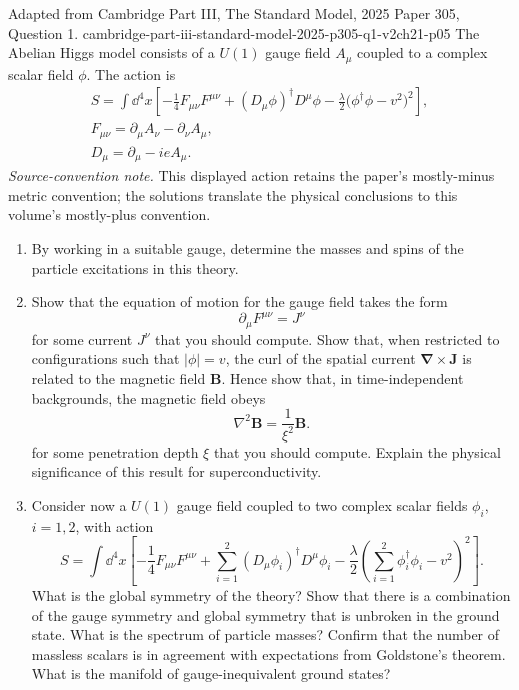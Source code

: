 \begin{enumerate}
  {Adapted from Cambridge Part III, The Standard Model, 2025 Paper 305,
  Question 1.}
  {cambridge-part-iii-standard-model-2025-p305-q1-v2ch21-p05}
  The Abelian Higgs model consists of a \(U(1)\) gauge field \(A_\mu\)
  coupled to a complex scalar field \(\phi\).  The action is
  \[
  \begin{gathered}
    S=\int \dd^4x\left[
      -\frac14F_{\mu\nu}F^{\mu\nu}
      +(D_\mu\phi)^\dagger D^\mu\phi
      -\frac{\lambda}{2}\bigl(\phi^\dagger\phi-v^2\bigr)^2
    \right],\\
    F_{\mu\nu}=\partial_\mu A_\nu-\partial_\nu A_\mu,\\
    D_\mu=\partial_\mu-ieA_\mu .
  \end{gathered}
  \]
  \emph{Source-convention note.}  This displayed action retains the
  paper's mostly-minus metric convention; the solutions translate the
  physical conclusions to this volume's mostly-plus convention.
  \begin{enumerate}
    \item[(i)]
    By working in a suitable gauge, determine the masses and spins of the
    particle excitations in this theory.
    \item[(ii)]
    Show that the equation of motion for the gauge field takes the form
    \[
      \partial_\mu F^{\mu\nu}=J^\nu
    \]
    for some current \(J^\nu\) that you should compute.  Show that, when
    restricted to configurations such that \(|\phi|=v\), the curl of the
    spatial current \(\boldsymbol\nabla\times\mathbf J\) is related to the
    magnetic field \(\mathbf B\).  Hence show that, in time-independent
    backgrounds, the magnetic field obeys
    \[
      \nabla^2\mathbf B=\frac1{\xi^2}\mathbf B .
    \]
    for some penetration depth \(\xi\) that you should compute.  Explain
    the physical significance of this result for superconductivity.
    \item[(iii)]
    Consider now a \(U(1)\) gauge field coupled to two complex scalar
    fields \(\phi_i\), \(i=1,2\), with action
    \[
      S=\int \dd^4x\left[
        -\frac14F_{\mu\nu}F^{\mu\nu}
        +\sum_{i=1}^2(D_\mu\phi_i)^\dagger D^\mu\phi_i
        -\frac{\lambda}{2}
          \left(\sum_{i=1}^2\phi_i^\dagger\phi_i-v^2\right)^2
      \right].
    \]
    What is the global symmetry of the theory?  Show that there is a
    combination of the gauge symmetry and global symmetry that is
    unbroken in the ground state.  What is the spectrum of particle
    masses?  Confirm that the number of massless scalars is in agreement
    with expectations from Goldstone's theorem.  What is the manifold of
    gauge-inequivalent ground states?
  \end{enumerate}


\end{enumerate}
